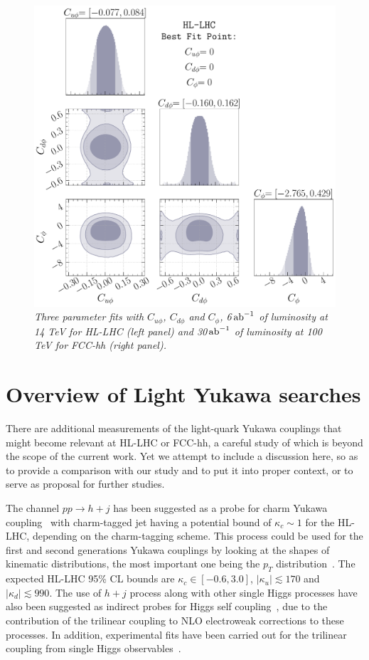 \begin{figure}[t!]
	\centering
	\includegraphics[width =0.47\linewidth]{fig/kappa_u-kappa_d-kappa_l-HL-LHC.pdf}
	\caption{\it Three parameter fits with $C_{u\phi}$, $C_{d\phi}$ and $C_\phi$, 6$\,{\rm ab}^{-1}$ of luminosity at 14 TeV for HL-LHC (left panel) and 30$\,{\rm ab}^{-1}$ of luminosity at 100 TeV for FCC-hh (right panel).}
	\label{fig:constraint3d}
\end{figure}

\section{Overview of Light Yukawa searches \label{sec:comparetoothers}}
There are additional measurements of the light-quark Yukawa couplings that might become relevant at HL-LHC or FCC-hh, a careful study of which is beyond the scope of the current work. Yet we attempt to include a discussion here, so as to provide a comparison with our study and to put it into proper context, or to serve as proposal for further studies.

The channel $pp \to h +j $ has been suggested as a probe for charm Yukawa coupling~\cite{Brivio:2015fxa} with charm-tagged jet having a potential bound of $\kappa_c\sim 1$ for the HL-LHC, depending on the charm-tagging scheme. This process could be used for the first and second generations Yukawa couplings by looking at the shapes of kinematic distributions, the most important one being the $p_T$ distribution~\cite{Soreq:2016rae,Bishara:2016jga, Bonner:2016sdg}. The expected HL-LHC 95\% CL bounds are $\kappa_c \in [-0.6,3.0]$, $|\kappa_u |\lesssim 170 $ and $|\kappa_d| \lesssim 990$. The use of $h+j$ process along with other single Higgs processes have also been suggested as indirect probes for Higgs self coupling~\cite{McCullough:2013rea,Gorbahn:2016uoy,Bizon:2016wgr,Degrassi:2016wml,Maltoni:2017ims,Degrassi:2021uik}, due to the contribution of the trilinear coupling to NLO electroweak corrections to these processes. In addition, experimental fits have been carried out for the trilinear coupling from single Higgs observables~\cite{CMS:2018rig,ATLAS:2019pbo}. 

